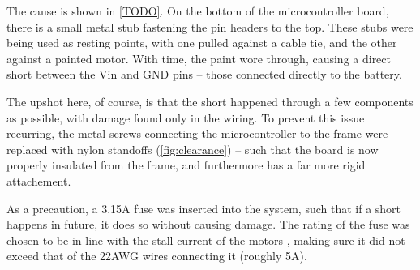 \documentclass[main.tex]{subfiles}
\begin{document}
	The cause is shown in \cref{TODO}. On the bottom of the microcontroller board, there is a small metal stub fastening the pin headers to the top. These stubs were being used as resting points, with one pulled against a cable tie, and the other against a painted motor. With time, the paint wore through, causing a direct short between the Vin and GND pins -- those connected directly to the battery.

	The upshot here, of course, is that the short happened through a few components as possible, with damage found only in the wiring. To prevent this issue recurring, the metal screws connecting the microcontroller to the frame were replaced with nylon standoffs (\cref{fig:clearance}) -- such that the board is now properly insulated from the frame, and furthermore has a far more rigid attachement.

	As a precaution, a 3.15A fuse was inserted into the system, such that if a short happens in future, it does so without causing damage. The rating of the fuse was chosen to be in line with the stall current of the motors \cite{motor}, making sure it did not exceed that of the 22AWG wires connecting it (roughly 5A).




\bib
\end{document}
